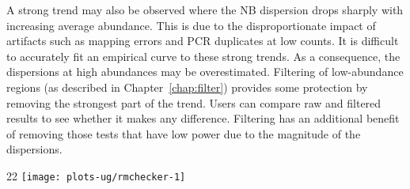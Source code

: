 \documentclass{report}\usepackage[]{graphicx}\usepackage[usenames,dvipsnames]{color}
\makeatletter
\def\maxwidth{ %
  \ifdim\Gin@nat@width>\linewidth
    \linewidth
  \else
    \Gin@nat@width
  \fi
}
\newcommand{\hlnum}[1]{\textcolor[rgb]{0.816,0.125,0.439}{#1}}%
\newcommand{\hlstr}[1]{\textcolor[rgb]{0.251,0.627,0.251}{#1}}%
\newcommand{\hlcom}[1]{\textcolor[rgb]{0.502,0.502,0.502}{\textit{#1}}}%
\newcommand{\hlopt}[1]{\textcolor[rgb]{0,0,0}{#1}}%
\newcommand{\hlstd}[1]{\textcolor[rgb]{0.251,0.251,0.251}{#1}}%
\newcommand{\hlkwb}[1]{\textcolor[rgb]{0,0,0}{#1}}%
\newcommand{\hlkwc}[1]{\textcolor[rgb]{0.251,0.251,0.251}{#1}}%
\newcommand{\hlkwd}[1]{\textcolor[rgb]{0.878,0.439,0.125}{#1}}%
\newenvironment{knitrout}{}{} %
\makeatother
\begin{document}
A strong trend may also be observed where the NB dispersion drops sharply with increasing average abundance.
This is due to the disproportionate impact of artifacts such as mapping errors and PCR duplicates at low counts. 
It is difficult to accurately fit an empirical curve to these strong trends.  
As a consequence, the dispersions at high abundances may be overestimated. 
Filtering of low-abundance regions (as described in Chapter~\ref{chap:filter}) provides some protection by removing the strongest part of the trend.
Users can compare raw and filtered results to see whether it makes any difference.
Filtering has an additional benefit of removing those tests that have low power due to the magnitude of the dispersions.

\begin{knitrout}
\color{fgcolor}\begin{adjustwidth}{2\fltoffset}{2\fltoffset}
\texttt{[image: plots-ug/rmchecker-1]} \end{adjustwidth}
\end{knitrout}
\end{document}

